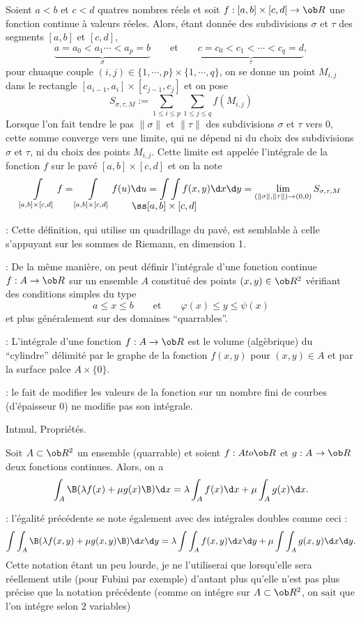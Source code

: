 \Definition []  Soient $a< b$ et $c< d$ quatres nombres réels et soit $f:[a,b]\times[c,d]\to\ob R$ une fonction continue à valeurs réeles. Alors, étant donnée des 
subdivisions $\sigma$ et $\tau$ des segments $[a,b]$ et $[c,d]$, 
$$
\underbrace{a=a_0< a_1\cdots< a_p=b}_{\sigma}\qquad \mbox{et}\qquad \underbrace{c=c_0< c_1< \cdots< c_q=d}_{\tau},
$$
pour chuaque couple $(i,j)\in\{1,\cdots,p\}\times\{1,\cdots,q\}$, on se donne un point $M_{i,j}$ dans le rectangle $[a_{i-1},a_i]\times[c_{j-1},c_j]$ et on pose 
$$
S_{\sigma,\tau,M}:=\sum_{1\le i\le p}\sum_{1\le j\le q}f(M_{i,j})
$$
Lorsque l'on fait tendre le pas $\|\sigma\|$ et $\|\tau\|$ des subdivisions $\sigma$ et $\tau$ vers $0$, cette somme converge vers une limite, qui ne dépend ni du choix des subdivisions $\sigma$ et $\tau$, ni du choix des points $M_{i,j}$. Cette limite est appelée l'intégrale de la fonction $f$ sur le pavé $[a,b]\times[c,d]$ et on la note
$$
\int\limits_{[a,b]\times[c,d]}f=\int\limits_{[a,b]\times[c,d]}f(u)\d u=\int\int\limits_{\llap{$\ss[a,b]\times[c,d]$}}f(x,y)\d x\d y =\lim_{(\|\sigma\|,\|\tau\|)\to(0,0)}S_{\sigma,\tau,M}
$$

 : Cette définition, qui utilise un quadrillage du pavé, est semblable à celle s'appuyant sur les sommes de Riemann, en dimension 1.
\bigskip

 : De la même manière, on peut définir l'intégrale d'une fonction continue $f:A\to\ob R$ 
sur un ensemble $A$ constitué des points $(x,y)\in\ob R^2$ vérifiant 
des conditions simples du type 
$$
a\le x\le b\qquad \mbox{et}\qquad \varphi(x)\le y\le \psi(x)
$$
et plus généralement sur des domaines ``quarrables''. 
\bigskip

 : L'intégrale d'une fonction $f:A\to\ob R$ est le volume (algèbrique) du ``cylindre'' délimité par le graphe de la fonction $f(x,y)$ pour $(x,y)\in A$
et par la surface palce $A\times\{0\}$. 
\bigskip

\Remarque : le fait de modifier les valeurs de la fonction sur un nombre fini de courbes (d'épaisseur $0$) ne modifie pas son intégrale. 
\bigskip


\Section Intmul, Propriétés. 

\Propriete [Title=Linéarité de l'intégrale]
Soit $A\subset\ob R^2$ un ensemble (quarrable) et soient $f:A to\ob R$ et $g:A\to\ob R$ deux fonctions continues. Alors, on a 
$$
\int_A\B(\lambda f(x)+\mu g(x)\B)\d x=\lambda\int_Af(x)\d x+\mu\int_Ag(x)\d x.
$$
 
\Remarque : l'égalité précédente se note également avec des intégrales doubles comme ceci : 
$$
\int\int_A\B(\lambda f(x,y)+\mu g(x,y)\B)\d x\d y=\lambda\int\int_Af(x,y)\d x\d y+\mu\int\int_Ag(x,y)\d x\d y.
$$
Cette notation étant un peu lourde, je ne l'utiliserai que lorsqu'elle sera réellement utile (pour Fubini par exemple) d'autant plus qu'elle n'est pas plus précise que la notation précédente (comme on intégre sur $A\subset\ob R^2$, on $\underline{\mbox{sait}}$ que l'on intégre selon $2$ variables)
\bigskip

